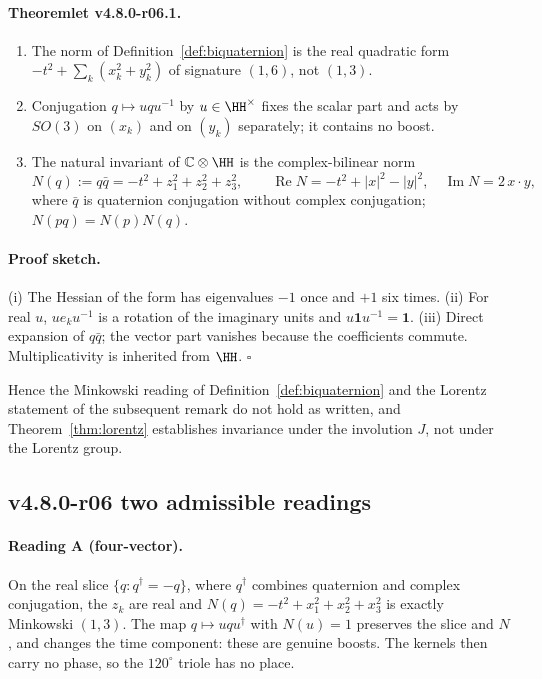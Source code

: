 \paragraph{Theoremlet v4.8.0-r06.1.}
\begin{enumerate}[label=(\roman*)]
\item The norm of Definition~\ref{def:biquaternion} is the real quadratic form
\(-t^2+\sum_k(x_k^2+y_k^2)\) of signature \((1,6)\), not \((1,3)\).
\item Conjugation \(q\mapsto uqu^{-1}\) by \(u\in\HH^\times\) fixes the scalar part and acts by
\(SO(3)\) on \((x_k)\) and on \((y_k)\) separately; it contains no boost.
\item The natural invariant of \(\mathbb C\otimes\HH\) is the complex-bilinear norm
\[
N(q):=q\bar q=-t^2+z_1^2+z_2^2+z_3^2,\qquad
\operatorname{Re}N=-t^2+|x|^2-|y|^2,\quad \operatorname{Im}N=2\,x\cdot y,
\]
where \(\bar q\) is quaternion conjugation without complex conjugation; \(N(pq)=N(p)N(q)\).
\end{enumerate}

\paragraph{Proof sketch.}
(i) The Hessian of the form has eigenvalues \(-1\) once and \(+1\) six times.  (ii) For real
\(u\), \(u e_k u^{-1}\) is a rotation of the imaginary units and \(u\mathbf 1u^{-1}=\mathbf 1\).
(iii) Direct expansion of \(q\bar q\); the vector part vanishes because the coefficients commute.
Multiplicativity is inherited from \(\HH\).  \(\square\)

Hence the Minkowski reading of Definition~\ref{def:biquaternion} and the Lorentz statement of the
subsequent remark do not hold as written, and Theorem~\ref{thm:lorentz} establishes invariance
under the involution \(J\), not under the Lorentz group.

\subsection*{v4.8.0-r06 two admissible readings}
\label{subsec:v480-r06-readings}

\paragraph{Reading A (four-vector).}
On the real slice \(\{q:q^\dagger=-q\}\), where \(q^\dagger\) combines quaternion and complex
conjugation, the \(z_k\) are real and \(N(q)=-t^2+x_1^2+x_2^2+x_3^2\) is exactly Minkowski
\((1,3)\).  The map \(q\mapsto uqu^\dagger\) with \(N(u)=1\) preserves the slice and \(N\), and
changes the time component: these are genuine boosts.  The kernels then carry no phase, so the
\(120^\circ\) triole has no place.

